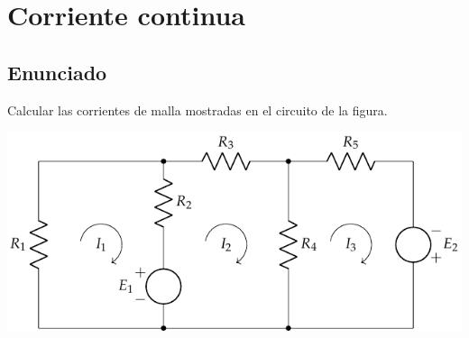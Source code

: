 \chapter{Corriente continua}

\section{Enunciado}
Calcular las corrientes de malla mostradas en el circuito de la
figura.

\begin{center}
  \includegraphics{figuras/BT1_02.pdf}
\end{center}

